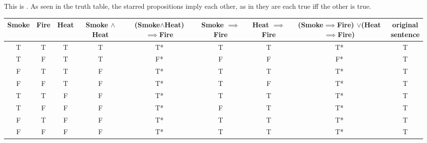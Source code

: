 \documentclass[]{homework}
\begin{document}
\begin{alphaparts}
\questionpart This is . As seen in the truth table, the starred propositions imply each other, as in they are each true iff the other is true. 

\begin{tabular}{|c|c|c|c|c|c|c|c|c|}
    \hline
    Smoke & Fire & Heat
    & \shortstack{Smoke\\$\land$Heat}
    & \shortstack{(Smoke$\land$Heat)\\$\implies$Fire}
    & \shortstack{Smoke\\$\implies$Fire}
    & \shortstack{Heat\\$\implies$Fire}
    & \shortstack{(Smoke$\implies$Fire)\\$\lor$(Heat$\implies$Fire)}
    & \shortstack{original\\sentence} \\
    \hline
    T & T & T & T & T* & T & T & T* & T \\
    T & F & T & T & F* & F & F & F* & T \\
    F & T & T & F & T* & T & T & T* & T \\
    F & F & T & F & T* & T & F & T* & T \\
    T & T & F & F & T* & T & T & T* & T \\
    T & F & F & F & T* & F & T & T* & T \\
    F & T & F & F & T* & T & T & T* & T \\
    F & F & F & F & T* & T & T & T* & T \\
    \hline
\end{tabular}
\end{alphaparts}
\end{document}
